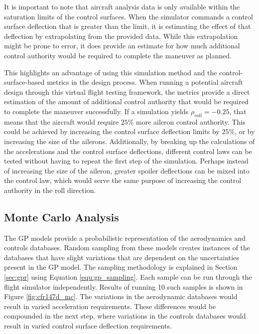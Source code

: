 It is important to note that aircraft analysis data is only available within the saturation limits of the control surfaces. 
When the simulator commands a control surface deflection that is greater than the limit, it is estimating the effect of that deflection by extrapolating from the provided data. 
While this extrapolation might be prone to error, it does provide an estimate for how much additional control authority would be required to complete the maneuver as planned. 

This highlights an advantage of using this simulation method and the control-surface-based metrics in the design process. 
When running a potential aircraft design through this virtual flight testing framework, the metrics provide a direct estimation of the amount of additional control authority that would be required to complete the maneuver successfully. 
If a simulation yields $\rho_{roll} = -0.25$, that means that the aircraft would require $25\%$ more aileron control authority. 
This could be achieved by increasing the control surface deflection limits by $25\%$, or by increasing the size of the ailerons. 
Additionally, by breaking up the calculations of the accelerations and the control surface deflections, different control laws can be tested without having to repeat the first step of the simulation. 
Perhaps instead of increasing the size of the aileron, greater spoiler deflections can be mixed into the control law, which would serve the same purpose of increasing the control authority in the roll direction. 

\subsection{Monte Carlo Analysis}

The GP models provide a probabilistic representation of the aerodynamics and controls databases. 
Random sampling from these models creates instances of the databases that have slight variations that are dependent on the uncertainties present in the GP model.
The sampling methodology is explained in Section \ref{sec:gpr} using Equation \ref{equ:gp_sampling}.
Each sample can be run through the flight simulator independently.
Results of running 10 such samples is shown in Figure \ref{fig:cfr147d_mc}.
The variations in the aerodynamic databases would result in varied acceleration requirements.
These differences would be compounded in the next step, where variations in the controls databases would result in varied control surface deflection requirements. 

